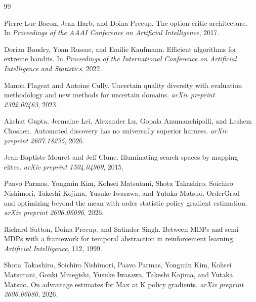 \documentclass{article}
\begin{document}
\begin{thebibliography}{99}

Pierre-Luc Bacon, Jean Harb, and Doina Precup.
\newblock The option-critic architecture.
\newblock In \emph{Proceedings of the AAAI Conference on Artificial Intelligence}, 2017.

Dorian Baudry, Yoan Russac, and Emilie Kaufmann.
\newblock Efficient algorithms for extreme bandits.
\newblock In \emph{Proceedings of the International Conference on Artificial Intelligence and Statistics}, 2022.

Manon Flageat and Antoine Cully.
\newblock Uncertain quality diversity with evaluation methodology and new methods for uncertain domains.
\newblock \emph{arXiv preprint 2302.00463}, 2023.

Akshat Gupta, Jermaine Lei, Alexander Lu, Gopala Anumanchipalli, and Leshem Choshen.
\newblock Automated discovery has no universally superior harness.
\newblock \emph{arXiv preprint 2607.18235}, 2026.

Jean-Baptiste Mouret and Jeff Clune.
\newblock Illuminating search spaces by mapping elites.
\newblock \emph{arXiv preprint 1504.04909}, 2015.

Paavo Parmas, Yongmin Kim, Kohsei Matsutani, Shota Takashiro, Soichiro Nishimori, Takeshi Kojima, Yusuke Iwasawa, and Yutaka Matsuo.
\newblock OrderGrad and optimizing beyond the mean with order statistic policy gradient estimation.
\newblock \emph{arXiv preprint 2606.06096}, 2026.

Richard Sutton, Doina Precup, and Satinder Singh.
\newblock Between MDPs and semi-MDPs with a framework for temporal abstraction in reinforcement learning.
\newblock \emph{Artificial Intelligence}, 112, 1999.

Shota Takashiro, Soichiro Nishimori, Paavo Parmas, Yongmin Kim, Kohsei Matsutani, Gouki Minegishi, Yusuke Iwasawa, Takeshi Kojima, and Yutaka Matsuo.
\newblock On advantage estimates for Max at K policy gradients.
\newblock \emph{arXiv preprint 2606.06080}, 2026.

\end{thebibliography}
\end{document}
